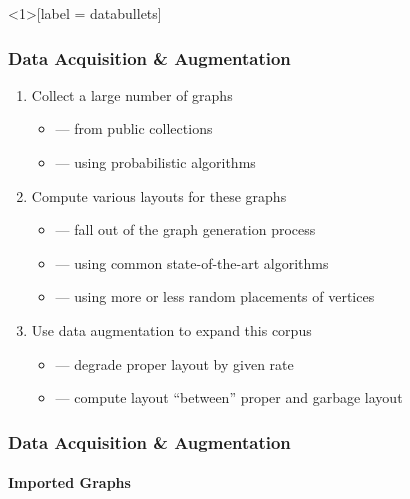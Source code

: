 \documentclass{beamer}
\begin{document}
\begin{frame}
\end{frame}

\begin{frame}<1>[label = databullets]
  \frametitle{Data Acquisition {\&} Augmentation}
  \begin{enumerate}
  \item<1-> Collect a large number of graphs
    \begin{itemize}
    \item{} --- from public collections
    \item{} --- using probabilistic algorithms
    \end{itemize}
    \par\bigskip
  \item<2-> Compute various layouts for these graphs
    \begin{itemize}
    \item{} --- fall out of the graph generation process
    \item{} --- using common state-of-the-art algorithms
    \item{} --- using more or less random placements of vertices
    \end{itemize}
    \par\bigskip
  \item<3-> Use data augmentation to expand this corpus
    \begin{itemize}
    \item{} --- degrade proper layout by given rate
    \item{} --- compute layout \enquote{between} proper and garbage layout
    \end{itemize}
  \end{enumerate}
\end{frame}

\begin{frame}
  \frametitle{Data Acquisition {\&} Augmentation}
  \framesubtitle{Imported Graphs}
  \newcommand*{\RandomSeed}{42}
\end{frame}
\end{document}
